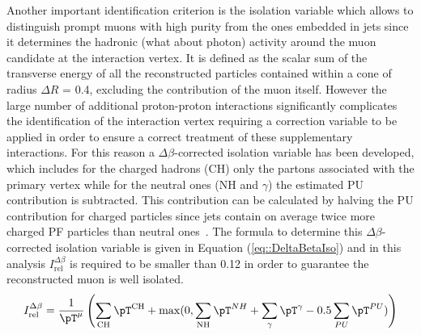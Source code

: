 Another important identification criterion is the isolation variable which allows to distinguish prompt muons with high purity from the ones embedded in jets since it determines the hadronic (what about photon) activity around the muon candidate at the interaction vertex. %
It is defined as the scalar sum of the transverse energy of all the reconstructed particles contained within a cone of radius $\Delta R$ = 0.4, excluding the contribution of the muon itself.
However the large number of additional proton-proton interactions significantly complicates the identification of the interaction vertex requiring a correction variable to be applied in order to ensure a correct treatment of these supplementary interactions. 
For this reason a $\Delta \beta$-corrected isolation variable has been developed, which includes for the charged hadrons (CH) only the partons associated with the primary vertex while for the neutral ones (NH and $\gamma$) the estimated PU contribution is subtracted. This contribution can be calculated by halving the PU contribution for charged particles since jets contain on average twice more charged PF particles than neutral ones~\cite{CHContrVsN}. The formula to determine this $\Delta \beta$-corrected isolation variable is given in Equation (\ref{eq::DeltaBetaIso}) and in this analysis $I_{\textrm{rel}}^{\Delta \beta}$ is required to be smaller than 0.12 in order to guarantee the reconstructed muon is well isolated.
\begin{equation}\label{eq::DeltaBetaIso}
 I_{\textrm{rel}}^{\Delta \beta} = \frac{1}{\pT^{\mu}} \left( \sum_{\textrm{CH}} \pT^{\textrm{CH}} + \max(0, \sum_{\textrm{NH}} \pT^{NH} + \sum_{\gamma} \pT^{\gamma} - 0.5 \sum_{PU} \pT^{PU}) \right)
\end{equation}
%

